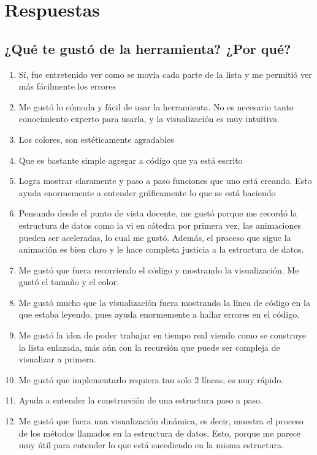 \chapter{Respuestas}
\label{anexo:comentarios}

\section{¿Qué te gustó de la herramienta? ¿Por qué?}

\begin{enumerate}
    \item Sí, fue entretenido ver como se movía cada parte de la lista y me permitió ver más fácilmente los errores
    \item Me gustó lo cómoda y fácil de usar la herramienta. No es necesario tanto conocimiento experto para usarla, y la visualización es muy intuitiva
    \item Los colores, son estéticamente agradables
    \item Que es bastante simple agregar a código que ya está escrito
    \item Logra mostrar claramente y paso a paso funciones que uno está creando. Esto ayuda enormemente a entender gráficamente lo que se está haciendo
    \item Pensando desde el punto de vista docente, me gustó porque me recordó la estructura de datos como la vi en cátedra por primera vez, las animaciones pueden ser aceleradas, lo cual me gustó. Además, el proceso que sigue la animación es bien claro y le hace completa justicia a la estructura de datos.
    \item Me gustó que fuera recorriendo el código y mostrando la visualización. Me gustó el tamaño y el color.
    \item Me gustó mucho que la visualización fuera mostrando la línea de código en la que estaba leyendo, pues ayuda enormemente a hallar errores en el código.
    \item Me gustó la idea de poder trabajar en tiempo real viendo como se construye la lista enlazada, más aún con la recursión que puede ser compleja de visualizar a primera.
    \item Me gustó que implementarlo requiera tan solo 2 líneas, es muy rápido.
    \item Ayuda a entender la construcción de una estructura paso a paso.
    \item Me gustó que fuera una visualización dinámica, es decir, muestra el proceso de los métodos llamados en la estructura de datos. Esto, porque me parece muy útil para entender lo que está sucediendo en la misma estructura.
\end{enumerate}

